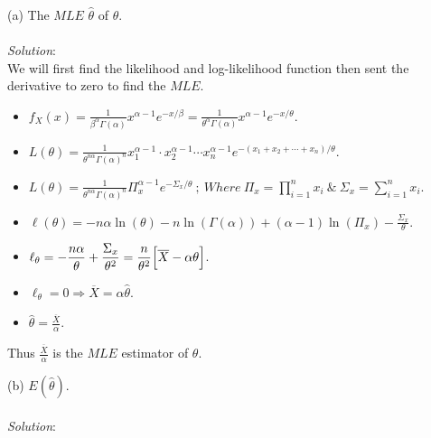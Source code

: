\documentclass[12pt]{article}
\newcommand{\XB}{\color{black}}
\newcommand{\XBB}{\color{blue}}
\newcommand{\ds}{\displaystyle}
\begin{document}
\XBB\hrulefill\XB 
\vspace{5mm} 

(a) The $ MLE $ $ \hat{\theta} $ of $ \theta $. \\
\vspace{2.5mm} \\
\textit{Solution}:
\vspace{2.5mm} \\

\noindent
We will first find the likelihood and log-likelihood function then sent the derivative to zero to find the $ MLE $. \\

\begin{itemize}
    \item $ \ds f_{X}(x) = \frac{1}{\beta^{\alpha}\Gamma(\alpha)}x^{\alpha - 1}e^{-x/\beta} = \frac{1}{\theta^{\alpha}\Gamma(\alpha)}x^{\alpha - 1}e^{-x/\theta} $.
    \item $ \ds L(\theta) = \frac{1}{\theta^{n\alpha}\Gamma(\alpha)^{n}}x_{1}^{\alpha - 1} \cdot x_{2}^{\alpha - 1} \cdots x_{n}^{\alpha - 1}e^{-(x_{1} + x_{2} + \cdots + x_{n})/\theta} $.
    \item $ \ds L(\theta) = \frac{1}{\theta^{n\alpha}\Gamma(\alpha)^{n}} \Pi_{x}^{\alpha - 1} e^{-\Sigma_{x}/\theta} \ ; \ Where \ \Pi_{x} = \prod_{i=1}^{n} x_{i} \ \& \ \Sigma_{x} = \sum_{i=1}^{n} x_{i} $.
    \item $ \ds \ell(\theta) = -n\alpha\ln(\theta) - n\ln(\Gamma(\alpha)) + (\alpha - 1)\ln(\Pi_{x}) - \frac{\Sigma_{x}}{\theta} $.
    \item $ \ds \ell_{\theta} = -\frac{n\alpha}{\theta} + \frac{\Sigma_{x}}{\theta^{2}} = \frac{n}{\theta^{2}} \Bigl[ \overline{X} - \alpha\theta \Bigr] $.
    \item $ \ds \ell_{\theta} = 0 \Rightarrow \overline{X} = \alpha\hat{\theta} $.
    \item $ \ds \hat{\theta} = \frac{\overline{X}}{\alpha} $.
\end{itemize}

\noindent
Thus $ \ds \frac{\overline{X}}{\alpha} $ is the $ MLE $ estimator of $ \theta $. \\

\vspace{2.5mm}
\newpage

(b) $ E(\hat{\theta}) $. \\
\vspace{2.5mm} \\
\textit{Solution}:
\vspace{2.5mm} \\ 
\end{document}
